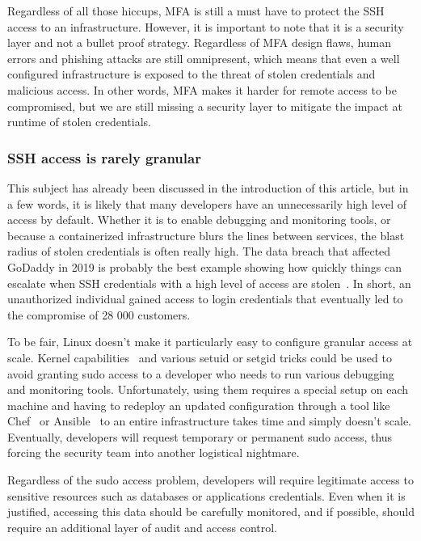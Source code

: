 Regardless of all those hiccups, MFA is still a must have to protect the SSH access to an infrastructure.
However, it is important to note that it is a security layer and not a bullet proof strategy.
Regardless of MFA design flaws, human errors and phishing attacks are still omnipresent, which means that even a well configured infrastructure is exposed to the threat of stolen credentials and malicious access.
In other words, MFA makes it harder for remote access to be compromised, but we are still missing a security layer to mitigate the impact at runtime of stolen credentials.

\subsubsection{SSH access is rarely granular}

This subject has already been discussed in the introduction of this article, but in a few words, it is likely that many developers have an unnecessarily high level of access by default.
Whether it is to enable debugging and monitoring tools, or because a containerized infrastructure blurs the lines between services, the blast radius of stolen credentials is often really high.
The data breach that affected GoDaddy in 2019 is probably the best example showing how quickly things can escalate when SSH credentials with a high level of access are stolen~\cite{MonitoringAndProtectingSSHSessionsWithEBPF:GoDaddy}.
In short, an unauthorized individual gained access to login credentials that eventually led to the compromise of 28 000 customers.

To be fair, Linux doesn’t make it particularly easy to configure granular access at scale.
Kernel capabilities~\cite{MonitoringAndProtectingSSHSessionsWithEBPF:KernelCapabilities} and various setuid or setgid tricks could be used to avoid granting sudo access to a developer who needs to run various debugging and monitoring tools.
Unfortunately, using them requires a special setup on each machine and having to redeploy an updated configuration through a tool like Chef~\cite{MonitoringAndProtectingSSHSessionsWithEBPF:Chef} or Ansible~\cite{MonitoringAndProtectingSSHSessionsWithEBPF:Ansible} to an entire infrastructure takes time and simply doesn’t scale.
Eventually, developers will request temporary or permanent sudo access, thus forcing the security team into another logistical nightmare.

Regardless of the sudo access problem, developers will require legitimate access to sensitive resources such as databases or applications credentials.
Even when it is justified, accessing this data should be carefully monitored, and if possible, should require an additional layer of audit and access control.

